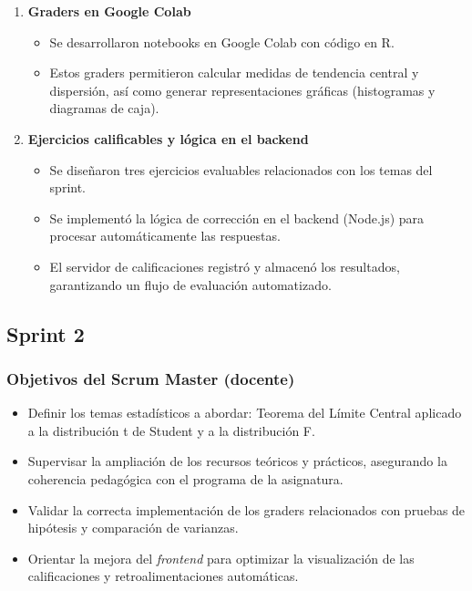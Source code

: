 \documentclass[letter,oneside,12pt,spanish]{report}
\begin{document}
\begin{enumerate}
    \item \textbf{Graders en Google Colab}
\begin{itemize}
	\item Se desarrollaron notebooks en Google Colab con código en R.
	\item Estos graders permitieron calcular medidas de tendencia central y dispersión, así como generar representaciones gráficas (histogramas y diagramas de caja).
\end{itemize}

\item \textbf{Ejercicios calificables y lógica en el backend}
\begin{itemize}
	\item Se diseñaron tres ejercicios evaluables relacionados con los temas del sprint.
	\item Se implementó la lógica de corrección en el backend (Node.js) para procesar automáticamente las respuestas.
	\item El servidor de calificaciones registró y almacenó los resultados, garantizando un flujo de evaluación automatizado.
\end{itemize}
\end{enumerate}



\subsection{Sprint 2}

\subsubsection*{Objetivos del Scrum Master (docente)}
\begin{itemize}
	\item Definir los temas estadísticos a abordar: Teorema del Límite Central aplicado a la distribución t de Student y a la distribución F.
	\item Supervisar la ampliación de los recursos teóricos y prácticos, asegurando la coherencia pedagógica con el programa de la asignatura.
	\item Validar la correcta implementación de los graders relacionados con pruebas de hipótesis y comparación de varianzas.
	\item Orientar la mejora del \textit{frontend} para optimizar la visualización de las calificaciones y retroalimentaciones automáticas.
\end{itemize}
\end{document}

